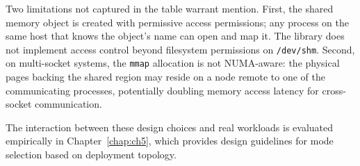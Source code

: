 Two limitations not captured in the table warrant mention. First, the shared memory object is created with permissive access permissions; any process on the same host that knows the object's name can open and map it. The library does not implement access control beyond filesystem permissions on \texttt{/dev/shm}. Second, on multi-socket systems, the \texttt{mmap} allocation is not NUMA-aware: the physical pages backing the shared region may reside on a node remote to one of the communicating processes, potentially doubling memory access latency for cross-socket communication.

The interaction between these design choices and real workloads is evaluated empirically in Chapter~\ref{chap:ch5}, which provides design guidelines for mode selection based on deployment topology.
